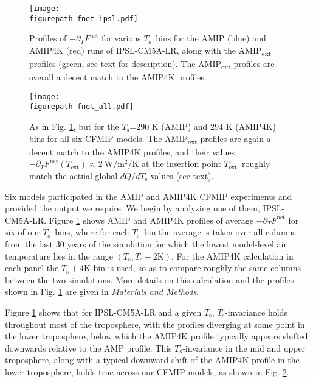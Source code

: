\documentclass[9pt,twocolumn,twoside,lineno]{pnas-new}
\newcommand{\ppt}{\ensuremath{\partial_T}}
\newcommand{\Fnet}{\ensuremath{F^\mathrm{net}}}
\newcommand{\WmsqK}{\ensuremath{\mathrm{W/m^2/K}}}
\newcommand{\Kelvin}{\ensuremath{\mathrm{K}}}
\newcommand{\Ts}{\ensuremath{T_\mathrm{s}}}
\newcommand{\Tlcl}{\ensuremath{T_\mathrm{LCL}}}
\newcommand{\Text}{\ensuremath{T_\mathrm{ext}}}
\newcommand{\figurepath}{./}
\begin{document}
\begin{figure}[t]
	\begin{center}
			\texttt{[image: \\figurepath fnet\_ipsl.pdf]}
		\caption{ Profiles of $-\ppt \Fnet$ for various \Ts\ bins for the AMIP (blue) and AMIP4K (red) runs of IPSL-CM5A-LR, along with the AMIP\textsubscript{ext} profiles (green, see text for description). The AMIP\textsubscript{ext} profiles are overall a decent match to the AMIP4K profiles.
		\label{fnet_ipsl}
		}
	\end{center}
\end{figure}


\begin{figure}[t]
	\begin{center}
			\texttt{[image: \\figurepath fnet\_all.pdf]}
		\caption{ As in Fig. \ref{fnet_ipsl}, but for the \Ts=290 K (AMIP) and 294 K (AMIP4K) bins for all six CFMIP models. The AMIP\textsubscript{ext} profiles are again a decent match to the AMIP4K profiles, and their values $-\ppt\Fnet(\Text)\approx 2\ \WmsqK$ at the insertion point \Text\ roughly match the actual  global $dQ/d\Ts$  values (see text).
		\label{fnet_all}
		}
	\end{center}
\end{figure}

Six models participated in the AMIP and AMIP4K CFMIP experiments and provided the output we require. We begin by analyzing one of them, IPSL-CM5A-LR. Figure \ref{fnet_ipsl} shows AMIP and AMIP4K  profiles of average $-\ppt \Fnet$ for six of our \Ts\ bins, where for each \Ts\ bin the average is taken over  all columns from the last 30 years of the simulation for which the lowest model-level air temperature lies in the range $(\Ts,\Ts +2\Kelvin)$. For the AMIP4K calculation in each panel the $\Ts +4\Kelvin$ bin is used, so as to compare roughly the same columns between the two simulations. 
More details on this calculation and the profiles shown in Fig. \ref{fnet_ipsl} are given in \emph{Materials and Methods}.

 Figure \ref{fnet_ipsl} shows that for IPSL-CM5A-LR and a given \Ts, \Ts-invariance holds throughout most of the troposphere, 
 with the profiles diverging at some point in the lower troposphere, below which the AMIP4K profile typically appears shifted downwards relative to the AMP  profile. 
 This \Ts-invariance in the mid and upper troposphere, along with a typical downward shift of the AMIP4K profile in the lower troposphere, holds true across our CFMIP models, as shown in Fig. \ref{fnet_all}.
\end{document}
